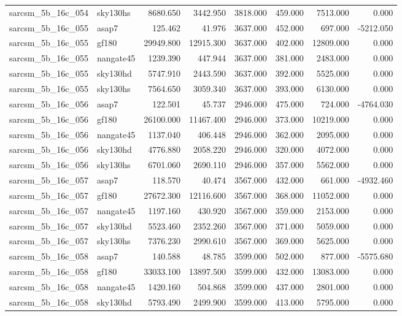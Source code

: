 \begin{tabular}{llrrrrrr}
sarcsm\_5b\_16c\_054 & sky130hs & 8680.650 & 3442.950 & 3818.000 & 459.000 & 7513.000 & 0.000 \\
sarcsm\_5b\_16c\_055 & asap7 & 125.462 & 41.976 & 3637.000 & 452.000 & 697.000 & -5212.050 \\
sarcsm\_5b\_16c\_055 & gf180 & 29949.800 & 12915.300 & 3637.000 & 402.000 & 12809.000 & 0.000 \\
sarcsm\_5b\_16c\_055 & nangate45 & 1239.390 & 447.944 & 3637.000 & 381.000 & 2483.000 & 0.000 \\
sarcsm\_5b\_16c\_055 & sky130hd & 5747.910 & 2443.590 & 3637.000 & 392.000 & 5525.000 & 0.000 \\
sarcsm\_5b\_16c\_055 & sky130hs & 7564.650 & 3059.340 & 3637.000 & 393.000 & 6130.000 & 0.000 \\
sarcsm\_5b\_16c\_056 & asap7 & 122.501 & 45.737 & 2946.000 & 475.000 & 724.000 & -4764.030 \\
sarcsm\_5b\_16c\_056 & gf180 & 26100.000 & 11467.400 & 2946.000 & 373.000 & 10219.000 & 0.000 \\
sarcsm\_5b\_16c\_056 & nangate45 & 1137.040 & 406.448 & 2946.000 & 362.000 & 2095.000 & 0.000 \\
sarcsm\_5b\_16c\_056 & sky130hd & 4776.880 & 2058.220 & 2946.000 & 320.000 & 4072.000 & 0.000 \\
sarcsm\_5b\_16c\_056 & sky130hs & 6701.060 & 2690.110 & 2946.000 & 357.000 & 5562.000 & 0.000 \\
sarcsm\_5b\_16c\_057 & asap7 & 118.570 & 40.474 & 3567.000 & 432.000 & 661.000 & -4932.460 \\
sarcsm\_5b\_16c\_057 & gf180 & 27672.300 & 12116.600 & 3567.000 & 368.000 & 11052.000 & 0.000 \\
sarcsm\_5b\_16c\_057 & nangate45 & 1197.160 & 430.920 & 3567.000 & 359.000 & 2153.000 & 0.000 \\
sarcsm\_5b\_16c\_057 & sky130hd & 5523.460 & 2352.260 & 3567.000 & 371.000 & 5059.000 & 0.000 \\
sarcsm\_5b\_16c\_057 & sky130hs & 7376.230 & 2990.610 & 3567.000 & 369.000 & 5625.000 & 0.000 \\
sarcsm\_5b\_16c\_058 & asap7 & 140.588 & 48.785 & 3599.000 & 502.000 & 877.000 & -5575.680 \\
sarcsm\_5b\_16c\_058 & gf180 & 33033.100 & 13897.500 & 3599.000 & 432.000 & 13083.000 & 0.000 \\
sarcsm\_5b\_16c\_058 & nangate45 & 1420.160 & 504.868 & 3599.000 & 437.000 & 2801.000 & 0.000 \\
sarcsm\_5b\_16c\_058 & sky130hd & 5793.490 & 2499.900 & 3599.000 & 413.000 & 5795.000 & 0.000 \\

\end{tabular}
